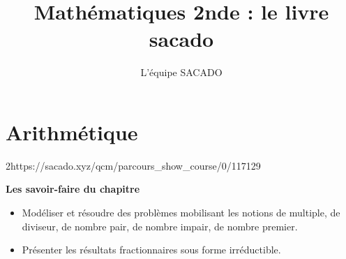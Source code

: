 



\title{Mathématiques 2nde  : le livre sacado}
\author{L'équipe SACADO}




\chapter{Arithmétique}{2}{https://sacado.xyz/qcm/parcours_show_course/0/117129}


 \begin{CpsCol}
\textbf{Les savoir-faire du chapitre}
 \begin{itemize}
\item Modéliser et résoudre des problèmes mobilisant les notions de multiple, de diviseur, de nombre pair, de nombre impair, de nombre premier.
\item Présenter les résultats fractionnaires sous forme irréductible.
 \end{itemize}
 \end{CpsCol}

